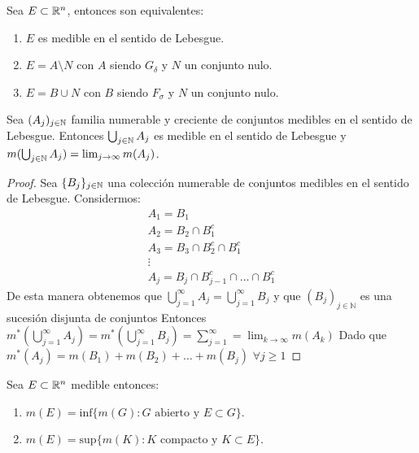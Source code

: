 \begin{corolario}
    Sea $E \subset \mathbb{R}^n$, entonces son equivalentes:
    \vspace{-0.5em}
    \begin{enumerate}
        \item $E$ es medible en el sentido de Lebesgue.
        \item $E = A \setminus N$ con $A$ siendo $G_\delta$ y $N$ un conjunto nulo.
        \item $E = B \cup N$ con $B$ siendo $F_\sigma$ y $N$ un conjunto nulo.
    \end{enumerate}
\end{corolario}

\begin{lema}
    Sea $(A_j)_{j \in \mathbb{N}}$ familia numerable y creciente de conjuntos medibles en el sentido de Lebesgue. Entonces $\bigcup_{j \in \mathbb{N}} A_j$ es medible en el sentido de Lebesgue y $m(\bigcup_{j \in \mathbb{N}} A_j) = \lim_{j \to \infty} m(A_j)$.
\end{lema}

\begin{proof}
    Sea $\{B_j\}_{j \in \mathbb{N}}$ una colección numerable de conjuntos medibles en el sentido de Lebesgue. Considermos:
    \[\begin{matrix}
            A_1 = B_1                       \\
            A_2 = B_2 \cap B_1^c            \\
            A_3 = B_3 \cap B_2^c \cap B_1^c \\
            \vdots                          \\
            A_j = B_j \cap B_{j-1}^c \cap \ldots \cap B_1^c
        \end{matrix}\]
    De esta manera obtenemos que $\bigcup_{j = 1}^{\infty} A_j = \bigcup_{j =
            1}^{\infty} B_j$ y que $(B_j)_{j \in \mathbb{N}}$ es una sucesión disjunta de
    conjuntos Entonces $m^*(\bigcup_{j = 1}^{\infty}A_j) = m^*(\bigcup_{j =
            1}^{\infty}B_j) = \sum_{j = 1}^{\infty} = \lim_{k \to \infty} m(A_k)$ Dado que
    $m^*(A_j) = m(B_1) + m(B_2) + \ldots + m(B_j)$ $ \forall j \geq 1$
\end{proof}

\begin{corolario}
    Sea $E \subset \mathbb{R}^n$ medible entonces:
    \vspace{-0.5em}
    \begin{enumerate}
        \item $m(E) = \text{inf}\{m(G) : G \text{ abierto y } E \subset G\}$.
        \item $m(E) = \text{sup}\{m(K) : K \text{ compacto y } K \subset E\}$.
    \end{enumerate}
\end{corolario}


